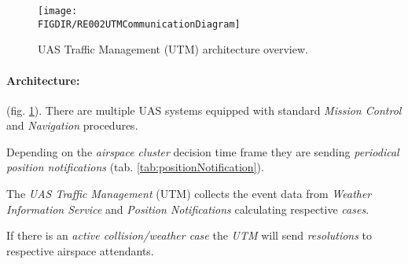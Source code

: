 \begin{figure}[H]
    \centering
    \texttt{[image: \\FIGDIR/RE002UTMCommunicationDiagram]} 
    \caption{UAS Traffic Management (UTM) architecture overview.}
    \label{fig:UTMArchitectureOverview}
\end{figure}

\paragraph{Architecture:} (fig. \ref{fig:UTMArchitectureOverview}).  There are multiple UAS systems equipped with standard \emph{Mission Control} and \emph{Navigation} procedures. 

Depending on the \emph{airspace cluster} decision time frame they are sending \emph{periodical position notifications} (tab. \ref{tab:positionNotification}).

The \emph{UAS Traffic Management} (UTM) collects the event data from \emph{Weather Information Service} and \emph{Position Notifications} calculating respective \emph{cases}. 

If there is an \emph{active collision/weather case} the \emph{UTM} will send \emph{resolutions} to respective airspace attendants. 
